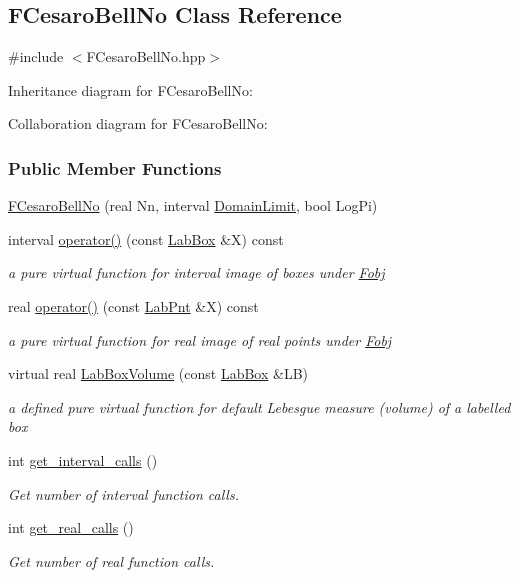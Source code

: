 \hypertarget{classFCesaroBellNo}{\subsection{\-F\-Cesaro\-Bell\-No \-Class \-Reference}
\label{classFCesaroBellNo}
}


{\ttfamily \#include $<$\-F\-Cesaro\-Bell\-No.\-hpp$>$}



\-Inheritance diagram for \-F\-Cesaro\-Bell\-No\-:


\-Collaboration diagram for \-F\-Cesaro\-Bell\-No\-:
\subsubsection*{\-Public \-Member \-Functions}
\begin{DoxyCompactItemize}
\item 
\hyperlink{classFCesaroBellNo_ab47f395482d2f680a299f6b58fb1cb62}{\-F\-Cesaro\-Bell\-No} (real \-Nn, interval \hyperlink{LevyFobj2D_8cpp_ae28a2599911ae746bc33211d3ea52aaf}{\-Domain\-Limit}, bool \-Log\-Pi)
\item 
interval \hyperlink{classFCesaroBellNo_a92568b498df7475dd13d20cb7bfa1d23}{operator()} (const \hyperlink{classLabBox}{\-Lab\-Box} \&\-X) const 
\begin{DoxyCompactList}\small\item\em a pure virtual function for interval image of boxes under \hyperlink{classFobj}{\-Fobj} \end{DoxyCompactList}\item 
real \hyperlink{classFCesaroBellNo_ab866e2831e6bf8c4fca46433ad2a6417}{operator()} (const \hyperlink{classLabPnt}{\-Lab\-Pnt} \&\-X) const 
\begin{DoxyCompactList}\small\item\em a pure virtual function for real image of real points under \hyperlink{classFobj}{\-Fobj} \end{DoxyCompactList}\item 
virtual real \hyperlink{classFCesaroBellNo_a565d2a382aed9be6b5aebd99810be370}{\-Lab\-Box\-Volume} (const \hyperlink{classLabBox}{\-Lab\-Box} \&\-L\-B)
\begin{DoxyCompactList}\small\item\em a defined pure virtual function for default \-Lebesgue measure (volume) of a labelled box \end{DoxyCompactList}\item 
int \hyperlink{classFCesaroBellNo_acfda8e11028fbc5d41cd8810cc17567f}{get\-\_\-interval\-\_\-calls} ()
\begin{DoxyCompactList}\small\item\em \-Get number of interval function calls. \end{DoxyCompactList}\item 
int \hyperlink{classFCesaroBellNo_a20e3fb43978e543c32d826bc9ccf07f8}{get\-\_\-real\-\_\-calls} ()
\begin{DoxyCompactList}\small\item\em \-Get number of real function calls. \end{DoxyCompactList}\end{DoxyCompactItemize}

